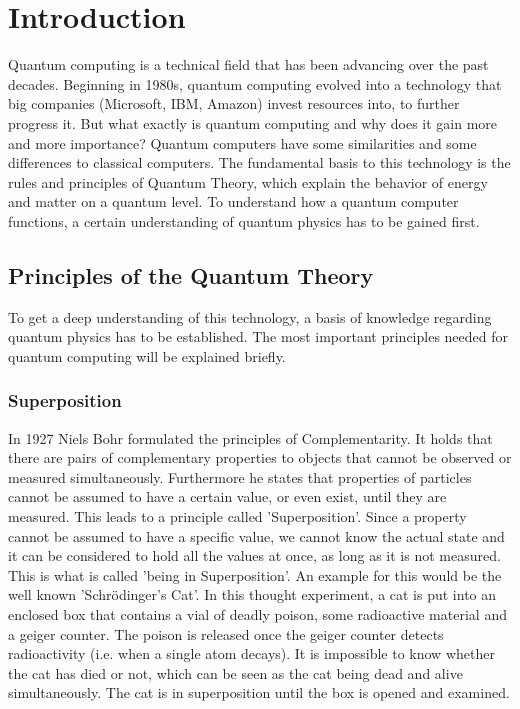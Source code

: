
\section{Introduction}
Quantum computing is a technical field that has been advancing over the past decades. Beginning in 1980s, quantum computing evolved into a technology that big companies (Microsoft, IBM, Amazon) invest resources into, to further progress it. But what exactly is quantum computing and why does it gain more and more importance?
Quantum computers have some similarities and some differences to classical computers. The fundamental basis to this technology is the rules and principles of Quantum Theory, which explain the behavior of energy and matter on a quantum level. To understand how a quantum computer functions, a certain understanding of quantum physics has to be gained first. 
\subsection{Principles of the Quantum Theory}
To get a deep understanding of this technology, a basis of knowledge regarding quantum physics has to be established. The most important principles needed for quantum computing will be explained briefly.
\subsubsection{Superposition}
In 1927 Niels Bohr formulated the principles of Complementarity. It holds that there are pairs of complementary properties to objects that cannot be observed or measured simultaneously. Furthermore he states that properties of particles cannot be assumed to have a certain value, or even exist, until they are measured. This leads to a principle called 'Superposition'. Since a property cannot be assumed to have a specific value, we cannot know the actual state and it can be considered to hold all the values at once, as long as it is not measured. This is what is called  'being in Superposition'. An example for this would be the well known 'Schrödinger's Cat'. In this thought experiment, a cat is put into an enclosed box that contains a vial of deadly poison, some radioactive material and a geiger counter. The poison is released once the geiger counter detects radioactivity (i.e. when a single atom decays). It is impossible to know whether the cat has died or not, which can be seen as the cat being dead and alive simultaneously. The cat is in superposition until the box is opened and examined.
